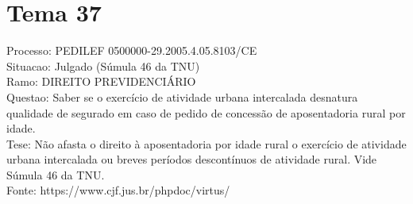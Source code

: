 \documentclass[12pt]{article}
\begin{document}
\section*{Tema 37}
Processo: PEDILEF 0500000-29.2005.4.05.8103/CE\\
Situacao: Julgado (Súmula 46 da TNU)\\
Ramo: DIREITO PREVIDENCIÁRIO\\
Questao: Saber se o exercício de atividade urbana intercalada desnatura qualidade de segurado em caso de pedido de concessão de aposentadoria rural por idade.\\
Tese: Não afasta o direito à aposentadoria por idade rural o exercício de atividade urbana intercalada ou breves períodos descontínuos de atividade rural. Vide Súmula 46 da TNU.\\
Fonte: https://www.cjf.jus.br/phpdoc/virtus/
\end{document}
